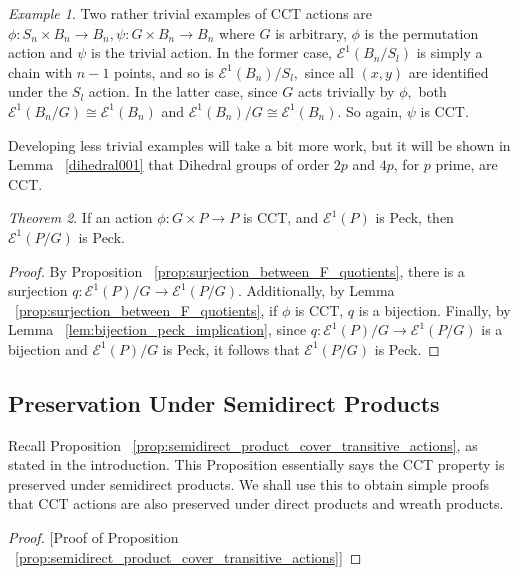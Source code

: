 \documentclass[10 pt]{amsart}
\theoremstyle{plain}
\theoremstyle{definition}
\theoremstyle{remark}
\numberwithin{equation}{section}
\newtheorem{thm}{Theorem}[section]
\theoremstyle{remark}
\newtheorem{eg}[thm]{Example}
\newcommand\ssec{\subsection}
\begin{document}
\begin{eg}
\label{eg:trivial_edgequot}
Two rather trivial examples of CCT actions are $\phi:S_n\times B_n \rightarrow B_n,\psi:G\times B_n\rightarrow B_n$ where $G$ is arbitrary, $\phi$ is the permutation action and $\psi$ is the trivial action. In the former case, $\mathcal E^1(B_n/S_l)$ is simply a chain with $n-1$ points, and so is $\mathcal E^1(B_n)/S_l,$ since all $(x, y)$ are identified under the $S_l$ action. In the latter case, since $G$ acts trivially by $\phi,$ both  $\mathcal E^1(B_n/G) \cong \mathcal E^1(B_n)$ and $\mathcal E^1(B_n)/G \cong \mathcal E^1(B_n).$ So again, $\psi$ is CCT.

Developing less trivial examples will take a bit more work, but it will be shown in Lemma ~\ref{dihedral001} that Dihedral groups of order $2p$ and $4p$, for $p$ prime, are CCT.
\end{eg}

\begin{thm}
If an action $\phi:G \times P \rightarrow P$ is CCT, and $\mathcal E^1(P)$ is Peck, then $\mathcal E^1(P/G)$ is Peck.
\end{thm}
\begin{proof}
By Proposition ~\ref{prop:surjection_between_F_quotients}, there is a surjection $q:\mathcal E^1(P)/G \rightarrow \mathcal E^1(P/G).$ Additionally, by Lemma ~\ref{prop:surjection_between_F_quotients}, if $\phi$ is CCT, $q$ is a bijection. Finally, by Lemma ~\ref{lem:bijection_peck_implication}, since $q:\mathcal E^1(P)/G \rightarrow \mathcal E^1(P/G)$ is a bijection and $\mathcal E^1(P)/G$ is Peck, it follows that $\mathcal E^1(P/G)$ is Peck.
\end{proof}


\ssec{Preservation Under Semidirect Products}
\label{ssec:semidirect_product_preservation}
Recall Proposition ~\ref{prop:semidirect_product_cover_transitive_actions}, as stated in the introduction. This Proposition essentially says the CCT property is preserved under semidirect products. We shall use this to obtain simple proofs that CCT actions are also preserved under direct products and wreath products.

\begin{proof}
[Proof of Proposition ~\ref{prop:semidirect_product_cover_transitive_actions}]
\end{proof}
\end{document}
